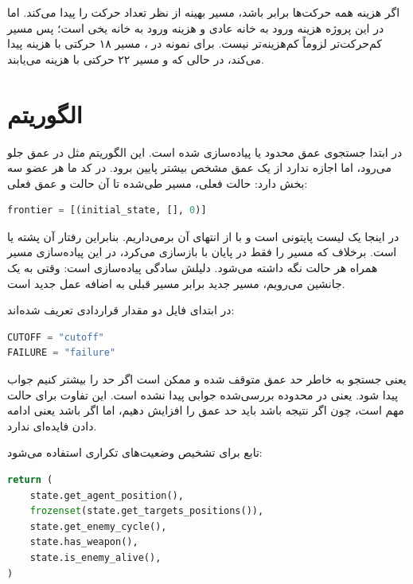 \documentclass[10.5pt]{exam}
\begin{document}
اگر هزینه همه حرکت‌ها برابر باشد، مسیر بهینه از نظر تعداد حرکت را پیدا می‌کند. اما در این پروژه هزینه ورود به خانه عادی
و هزینه ورود به خانه یخی
است؛ پس مسیر کم‌حرکت‌تر لزوماً کم‌هزینه‌تر نیست. برای نمونه در
،
مسیر ۱۸ حرکتی با هزینه
پیدا می‌کند، در حالی که
و
مسیر ۲۲ حرکتی با هزینه
می‌یابند.

\section{الگوریتم }
در
ابتدا جستجوی عمق محدود یا
پیاده‌سازی شده است. این الگوریتم مثل
در عمق جلو می‌رود، اما اجازه ندارد از یک عمق مشخص بیشتر پایین برود. در کد ما هر عضو
سه بخش دارد: حالت فعلی، مسیر طی‌شده تا آن حالت و عمق فعلی:

\begin{latin}
\begin{lstlisting}[language=Python]
frontier = [(initial_state, [], 0)]
\end{lstlisting}
\end{latin}

در اینجا
یک لیست پایتونی است و با
از انتهای آن برمی‌داریم. بنابراین رفتار آن پشته یا
است. برخلاف
که مسیر را فقط در پایان با
بازسازی می‌کرد، در این پیاده‌سازی مسیر همراه هر حالت نگه داشته می‌شود. دلیلش سادگی پیاده‌سازی است: وقتی به یک جانشین می‌رویم، مسیر جدید برابر مسیر قبلی به اضافه عمل جدید است.

در ابتدای فایل دو مقدار قراردادی تعریف شده‌اند:

\begin{latin}
\begin{lstlisting}[language=Python]
CUTOFF = "cutoff"
FAILURE = "failure"
\end{lstlisting}
\end{latin}

یعنی جستجو به خاطر حد عمق متوقف شده و ممکن است اگر حد را بیشتر کنیم جواب پیدا شود.
یعنی در محدوده بررسی‌شده جوابی پیدا نشده است. این تفاوت برای حالت
مهم است، چون اگر نتیجه
باشد باید حد عمق را افزایش دهیم، اما اگر
باشد یعنی ادامه دادن فایده‌ای ندارد.

تابع
برای تشخیص وضعیت‌های تکراری استفاده می‌شود:

\begin{latin}
\begin{lstlisting}[language=Python]
return (
    state.get_agent_position(),
    frozenset(state.get_targets_positions()),
    state.get_enemy_cycle(),
    state.has_weapon(),
    state.is_enemy_alive(),
)
\end{lstlisting}
\end{latin}
\end{document}
